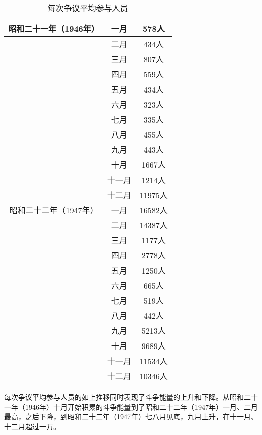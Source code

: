 \documentclass[a4paper,12pt]{article}
\begin{document}
\begin{table}
  \begin{tabular}{|c|c|c|}
    \hline
    昭和二十一年（1946年） & 一月 & 578人 \\ 
    \hline
                         & 二月 & 434人 \\ 
    \hline
                         & 三月 & 807人 \\ 
    \hline
                         & 四月 & 559人 \\ 
    \hline
                         & 五月 & 434人 \\ 
    \hline
                         & 六月 & 323人 \\ 
    \hline
                         & 七月 & 335人 \\ 
    \hline
                         & 八月 & 455人 \\ 
    \hline
                         & 九月 & 443人 \\ 
    \hline
                         & 十月 & 1667人 \\ 
    \hline
                         & 十一月 & 1214人 \\ 
    \hline
                         & 十二月 & 11975人 \\ 
    \hline
    昭和二十二年（1947年） & 一月 & 16582人 \\ 
    \hline
                         & 二月 & 14387人 \\ 
    \hline
                         & 三月 & 1177人 \\ 
    \hline
                         & 四月 & 2778人 \\ 
    \hline
                         & 五月 & 1250人 \\ 
    \hline
                         & 六月 & 665人 \\ 
    \hline
                         & 七月 & 519人 \\ 
    \hline
                         & 八月 & 442人 \\ 
    \hline
                         & 九月 & 5213人 \\ 
    \hline
                         & 十月 & 9689人 \\ 
    \hline
                         & 十一月 & 11534人 \\ 
    \hline
                         & 十二月 & 10346人 \\ 
    \hline
  \end{tabular}
  \caption{每次争议平均参与人员}
\end{table}
每次争议平均参与人员的如上推移同时表现了斗争能量的上升和下降。从昭和二十一年（1946年）十月开始积累的斗争能量到了昭和二十二年（1947年）一月、二月最高，之后下降，到昭和二十二年（1947年）七八月见底，九月上升，在十一月、十二月超过一万。
\end{document}
